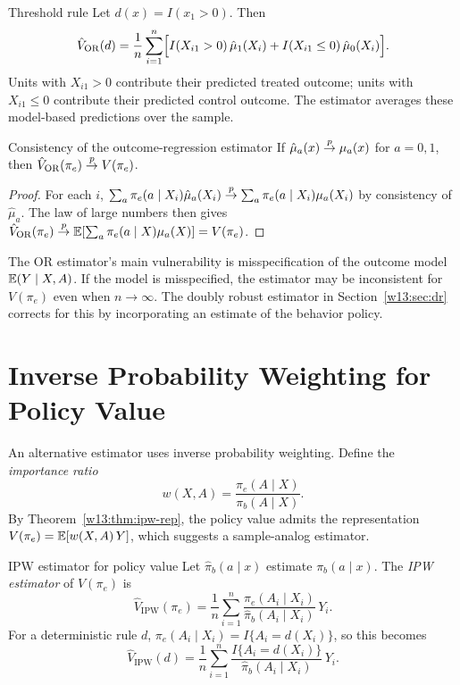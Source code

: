 \documentclass[master.tex]{subfiles}
\begin{document}
\begin{example}{Threshold rule}
\label{w13:ex:or-threshold}
Let $d(x)=I(x_1>0)$.  Then
\[
\hat V_{\mathrm{OR}}(d)
=
\frac{1}{n}\sum_{i=1}^n
\Bigl[
I(X_{i1}>0)\,\hat\mu_1(X_i)
+
I(X_{i1}\le 0)\,\hat\mu_0(X_i)
\Bigr].
\]
Units with $X_{i1}>0$ contribute their predicted treated outcome; units with $X_{i1}\le 0$ contribute their predicted control outcome.  The estimator averages these model-based predictions over the sample.
\end{example}

\begin{prop}{Consistency of the outcome-regression estimator}
\label{w13:prop:or-consistent}
If $\hat\mu_a(x)\overset{p}{\to}\mu_a(x)$ for $a=0,1$, then $\hat V_{\mathrm{OR}}(\pi_e)\overset{p}{\to} V(\pi_e)$.
\end{prop}

\begin{proof}
For each $i$, $\sum_a\pi_e(a\mid X_i)\hat\mu_a(X_i)\overset{p}{\to}\sum_a\pi_e(a\mid X_i)\mu_a(X_i)$ by consistency of $\hat\mu_a$. The law of large numbers then gives $\hat V_{\mathrm{OR}}(\pi_e)\overset{p}{\to}\mathbb{E}[\sum_a\pi_e(a\mid X)\mu_a(X)]=V(\pi_e)$.
\end{proof}

\begin{remark}
The OR estimator's main vulnerability is misspecification of the outcome model $\mathbb{E}(Y\mid X,A)$.  If the model is misspecified, the estimator may be inconsistent for $V(\pi_e)$ even when $n\to\infty$.  The doubly robust estimator in Section~\ref{w13:sec:dr} corrects for this by incorporating an estimate of the behavior policy.
\end{remark}

\section{Inverse Probability Weighting for Policy Value}
\label{w13:sec:ipw}

An alternative estimator uses inverse probability weighting.  Define the \emph{importance ratio}
\[
w(X,A) = \frac{\pi_e(A\mid X)}{\pi_b(A\mid X)}.
\]
By Theorem~\ref{w13:thm:ipw-rep}, the policy value admits the representation $V(\pi_e)=\mathbb{E}[w(X,A)\,Y]$, which suggests a sample-analog estimator.

\begin{defn}{IPW estimator for policy value}
\label{w13:defn:ipw-est}
Let $\hat\pi_b(a\mid x)$ estimate $\pi_b(a\mid x)$.  The \emph{IPW estimator} of $V(\pi_e)$ is
\[
\hat V_{\mathrm{IPW}}(\pi_e)
=
\frac{1}{n}\sum_{i=1}^n
\frac{\pi_e(A_i\mid X_i)}{\hat\pi_b(A_i\mid X_i)}\,Y_i.
\]
For a deterministic rule $d$, $\pi_e(A_i\mid X_i)=I\{A_i=d(X_i)\}$, so this becomes
\[
\hat V_{\mathrm{IPW}}(d)
=
\frac{1}{n}\sum_{i=1}^n
\frac{I\{A_i=d(X_i)\}}{\hat\pi_b(A_i\mid X_i)}\,Y_i.
\]
\end{defn}
\end{document}

